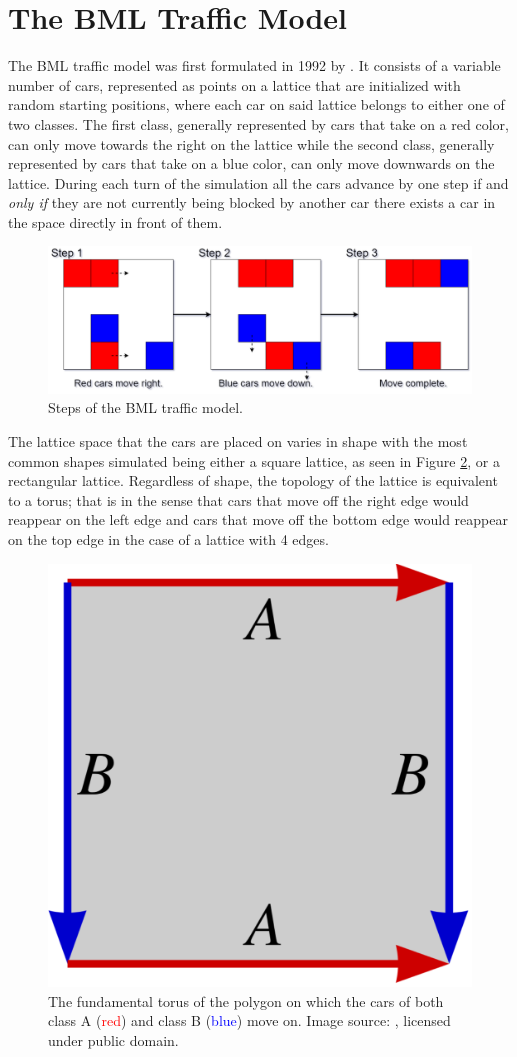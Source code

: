 \section{The BML Traffic Model}
\label{sec:The-BML-Traffic-Model}
The BML traffic model was first formulated in 1992 by \citet{Biham}. It consists of a variable number of cars, represented as points on a lattice that are initialized with random starting positions, where each car on said lattice belongs to either one of two classes. The first class, generally represented by cars that take on a red color, can only move towards the right on the lattice while the second class, generally represented by cars that take on a blue color, can only move downwards on the lattice. During each turn of the simulation all the cars advance by one step if and \textit{only if} they are not currently being blocked by another car \ie there exists a car  in the space directly in front of them.

\begin{figure}[htb!]
    \centering
    \includegraphics[width=\linewidth]{Images/Section 2/BML Step.pdf}
    \caption{Steps of the BML traffic model.}
    \label{fig:BML-Step}
\end{figure}

\noindent The lattice space that the cars are placed on varies in shape with the most common shapes simulated being either a square lattice, as seen in Figure \ref{fig:BML-Torus}, or a rectangular lattice. Regardless of shape, the topology of the lattice is equivalent to a torus; that is in the sense that cars that move off the right edge would reappear on the left edge and cars that move off the bottom edge would reappear on the top edge in the case of a lattice with 4 edges.

\begin{figure}[htb!]
    \centering
    \includegraphics[width=0.25\linewidth]{Images/Section 2/BML Torus.pdf}
    \caption{The fundamental torus of the polygon on which the cars of both class A (\textcolor{red}{red}) and class B (\textcolor{blue}{blue}) move on. Image source: \cite{Wikipedia_Torus}, licensed under public domain.}
    \label{fig:BML-Torus}
\end{figure}

